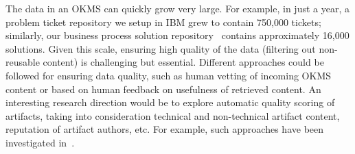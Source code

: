 The data in an OKMS can quickly grow very large. For example, in just a year, a
problem ticket repository we setup in IBM grew to contain 750,000 tickets;
similarly, our business process solution repository~\cite{Goodwin:2012b}
contains approximately 16,000 solutions. Given this scale, ensuring high quality
of the data (\eg filtering out non-reusable content) is challenging but
essential. Different approaches could be followed for ensuring data quality,
such as human vetting of incoming OKMS content or based on human feedback on
usefulness of retrieved content. An interesting research direction would be to
explore automatic quality scoring of artifacts, taking into consideration
technical and non-technical artifact content, reputation of artifact authors,
etc. For example, such approaches have been investigated
in~\cite{Majumdar:2011}.




